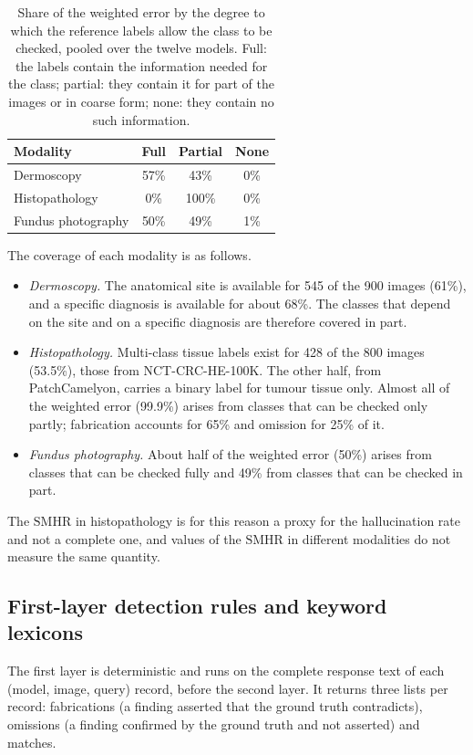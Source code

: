 \documentclass[11pt,a4paper]{article}
\newcommand{\SMHR}{\ensuremath{\mathrm{SMHR}}}
\begin{document}
\begin{appendices}
\begin{table}[tbp]
\centering
\small
\caption{Share of the weighted error by the degree to which the reference labels allow the class to be checked, pooled over the twelve models. Full: the labels contain the information needed for the class; partial: they contain it for part of the images or in coarse form; none: they contain no such information.}
\label{tab:coverage}
\begin{tabular}{@{}lccc@{}}
\toprule
Modality & Full & Partial & None \\
\midrule
Dermoscopy & 57\% & 43\% & 0\% \\
Histopathology & 0\% & 100\% & 0\% \\
Fundus photography & 50\% & 49\% & 1\% \\
\bottomrule
\end{tabular}
\end{table}

The coverage of each modality is as follows.
\begin{itemize}
  \item \emph{Dermoscopy.} The anatomical site is available for 545 of the 900 images (61\%), and a specific diagnosis is available for about 68\%. The classes that depend on the site and on a specific diagnosis are therefore covered in part.
  \item \emph{Histopathology.} Multi-class tissue labels exist for 428 of the 800 images (53.5\%), those from NCT-CRC-HE-100K. The other half, from PatchCamelyon, carries a binary label for tumour tissue only. Almost all of the weighted error (99.9\%) arises from classes that can be checked only partly; fabrication accounts for 65\% and omission for 25\% of it.
  \item \emph{Fundus photography.} About half of the weighted error (50\%) arises from classes that can be checked fully and 49\% from classes that can be checked in part.
\end{itemize}
The \SMHR{} in histopathology is for this reason a proxy for the hallucination rate and not a complete one, and values of the \SMHR{} in different modalities do not measure the same quantity.

\subsection{First-layer detection rules and keyword lexicons}
\label{app:lexicons}

The first layer is deterministic and runs on the complete response text of each (model, image, query) record, before the second layer. It returns three lists per record: fabrications (a finding asserted that the ground truth contradicts), omissions (a finding confirmed by the ground truth and not asserted) and matches.


\end{appendices}
\end{document}
